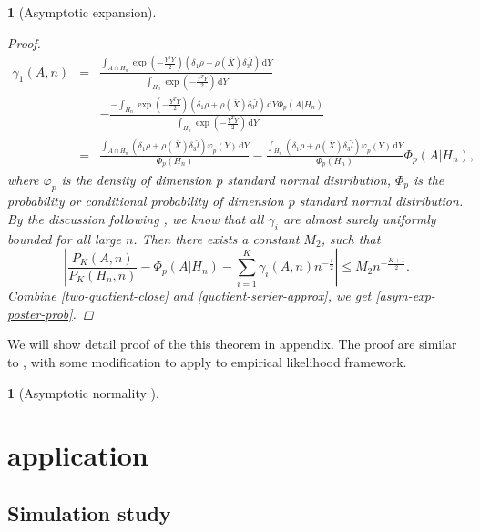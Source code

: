 \documentclass[oneside,english]{amsbook}
\numberwithin{section}{chapter}
\numberwithin{equation}{section}
\numberwithin{figure}{section}
\theoremstyle{plain}
\theoremstyle{plain}
\theoremstyle{definition}
\theoremstyle{plain}
\newtheorem{thm}{\protect\theoremname}
\theoremstyle{plain}
\newtheorem{cor}{\protect\corollaryname}
\theoremstyle{remark}
\theoremstyle{definition}
\theoremstyle{definition}
\newcommand{\diff}{\,\mathrm{d}}
\providecommand{\corollaryname}{Corollary}
\providecommand{\theoremname}{Theorem}
\begin{document}
\begin{thm}[Asymptotic expansion]
\begin{proof}
\begin{eqnarray*}
\gamma_{1}\left(A,n\right) & = & \frac{\int_{A\cap H_{n}}\exp\left(-\frac{Y^{T}Y}{2}\right)\left(\delta_{1}\rho+\rho\left(\overline{X}\right)\delta_{3}\hat{l}\right)\diff Y}{\int_{H_{n}}\exp\left(-\frac{Y^{T}Y}{2}\right)\diff Y}\\
 &  & -\frac{-\int_{H_{n}}\exp\left(-\frac{Y^{T}Y}{2}\right)\left(\delta_{1}\rho+\rho\left(\overline{X}\right)\delta_{3}\hat{l}\right)\diff Y\Phi_{p}\left(A|H_{n}\right)}{\int_{H_{n}}\exp\left(-\frac{Y^{T}Y}{2}\right)\diff Y}\\
 & = & \frac{\int_{A\cap H_{n}}\left(\delta_{1}\rho+\rho\left(\overline{X}\right)\delta_{3}\hat{l}\right)\varphi_{p}\left(Y\right)\diff Y}{\Phi_{p}\left(H_{n}\right)}-\frac{\int_{H_{n}}\left(\delta_{1}\rho+\rho\left(\overline{X}\right)\delta_{3}\hat{l}\right)\varphi_{p}\left(Y\right)\diff Y}{\Phi_{p}\left(H_{n}\right)}\Phi_{p}\left(A|H_{n}\right),
\end{eqnarray*}
where $\varphi_{p}$ is the density of dimension $p$ standard normal
distribution, $\Phi_{p}$ is the probability or conditional probability
of dimension $p$ standard normal distribution. By the discussion
following , we know that
all $\gamma_{i}$ are almost surely uniformly bounded for all large
$n$. Then there exists a constant $M_{2}$, such that 
\begin{equation}
\left|\frac{P_{K}\left(A,n\right)}{P_{K}\left(H_{n},n\right)}-\Phi_{p}\left(A|H_{n}\right)-\sum_{i=1}^{K}\gamma_{i}\left(A,n\right)n^{-\frac{i}{2}}\right|\le M_{2}n^{-\frac{K+1}{2}}.\label{eq:quotient-serier-approx}
\end{equation}
Combine \eqref{two-quotient-close} and \eqref{quotient-serier-approx},
we get \eqref{asym-exp-poster-prob}.
\end{proof}
\end{thm}
We will show detail proof of the this theorem in appendix. The proof
are similar to \citet{johnson1970asymptotic}, with some modification
to apply to empirical likelihood framework. 
\begin{cor}[Asymptotic normality ]

\end{cor}

\section{application\label{sec:application}}


\subsection{Simulation study}
\end{document}
